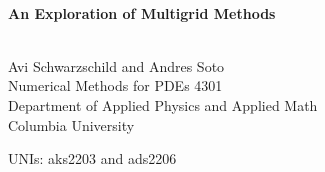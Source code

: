 \begin{titlepage}
\begin{center}




\HRule \\[0.4cm]
{ \huge \bfseries An Exploration of Multigrid Methods \\[0.4cm] }

\HRule \\[1.5cm]

\LARGE Avi Schwarzschild and Andres Soto \\[0.5cm]

\small Numerical Methods for PDEs 4301\\[0.5cm]

Department of Applied Physics and Applied Math \\

Columbia University\\


\begin{minipage}{0.4\textwidth}
\end{minipage}

\vfill

{\small UNIs: aks2203 and ads2206}


\end{center}
\end{titlepage}